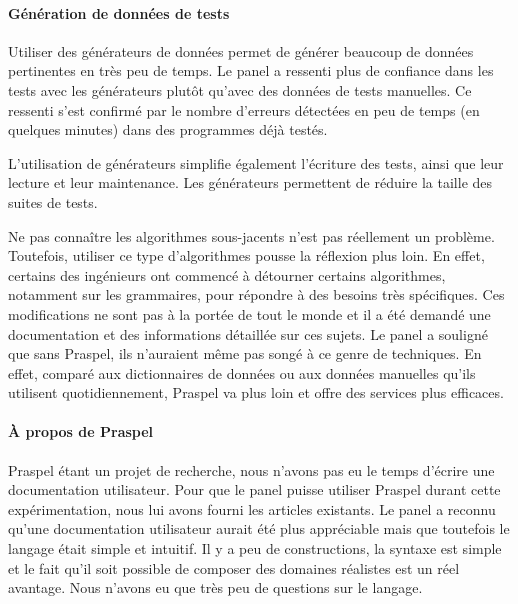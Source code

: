 \paragraph{Génération de données de tests} Utiliser des générateurs de données
permet de générer beaucoup de données pertinentes en très peu de temps. Le panel
a ressenti plus de confiance dans les tests avec les générateurs plutôt qu'avec
des données de tests manuelles. Ce ressenti s'est confirmé par le nombre
d'erreurs détectées en peu de temps (en quelques minutes) dans des programmes
déjà testés.

L'utilisation de générateurs simplifie également l'écriture des tests, ainsi que
leur lecture et leur maintenance. Les générateurs permettent de réduire la
taille des suites de tests.

Ne pas connaître les algorithmes sous-jacents n'est pas réellement un problème.
Toutefois, utiliser ce type d'algorithmes pousse la réflexion plus loin. En
effet, certains des ingénieurs ont commencé à détourner certains algorithmes,
notamment sur les grammaires, pour répondre à des besoins très spécifiques. Ces
modifications ne sont pas à la portée de tout le monde et il a été demandé une
documentation et des informations détaillée sur ces sujets. Le panel a souligné
que sans Praspel, ils n'auraient même pas songé à ce genre de techniques. En
effet, comparé aux dictionnaires de données ou aux données manuelles qu'ils
utilisent quotidiennement, Praspel va plus loin et offre des services plus
efficaces.

\paragraph{À propos de Praspel} Praspel étant un projet de recherche, nous
n'avons pas eu le temps d'écrire une documentation utilisateur. Pour que le
panel puisse utiliser Praspel durant cette expérimentation, nous lui avons
fourni les articles existants.
Le panel a reconnu qu'une documentation utilisateur aurait été plus appréciable
mais que toutefois le langage était simple et intuitif. Il y a peu de
constructions, la syntaxe est simple et le fait qu'il soit possible de composer
des domaines réalistes est un réel avantage. Nous n'avons eu que très peu de
questions sur le langage.

